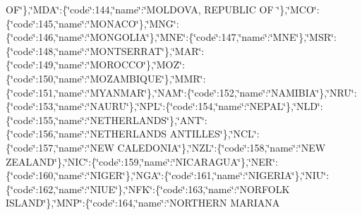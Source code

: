 \begin{DoxyCompactItemize}
O\-F\char`\"{}\},\char`\"{}M\-D\-A\char`\"{}\-:\{\char`\"{}code\char`\"{}\-:144,\char`\"{}name\char`\"{}\-:\char`\"{}M\-O\-L\-D\-O\-V\-A, R\-E\-P\-U\-B\-L\-I\-C O\-F \char`\"{}\},\char`\"{}M\-C\-O\char`\"{}\-:\{\char`\"{}code\char`\"{}\-:145,\char`\"{}name\char`\"{}\-:\char`\"{}M\-O\-N\-A\-C\-O\char`\"{}\},\char`\"{}M\-N\-G\char`\"{}\-:\{\char`\"{}code\char`\"{}\-:146,\char`\"{}name\char`\"{}\-:\char`\"{}M\-O\-N\-G\-O\-L\-I\-A\char`\"{}\},\char`\"{}M\-N\-E\char`\"{}\-:\{\char`\"{}code\char`\"{}\-:147,\char`\"{}name\char`\"{}\-:\char`\"{}M\-N\-E\char`\"{}\},\char`\"{}M\-S\-R\char`\"{}\-:\{\char`\"{}code\char`\"{}\-:148,\char`\"{}name\char`\"{}\-:\char`\"{}M\-O\-N\-T\-S\-E\-R\-R\-A\-T\char`\"{}\},\char`\"{}M\-A\-R\char`\"{}\-:\{\char`\"{}code\char`\"{}\-:149,\char`\"{}name\char`\"{}\-:\char`\"{}M\-O\-R\-O\-C\-C\-O\char`\"{}\},\char`\"{}M\-O\-Z\char`\"{}\-:\{\char`\"{}code\char`\"{}\-:150,\char`\"{}name\char`\"{}\-:\char`\"{}M\-O\-Z\-A\-M\-B\-I\-Q\-U\-E\char`\"{}\},\char`\"{}M\-M\-R\char`\"{}\-:\{\char`\"{}code\char`\"{}\-:151,\char`\"{}name\char`\"{}\-:\char`\"{}M\-Y\-A\-N\-M\-A\-R\char`\"{}\},\char`\"{}N\-A\-M\char`\"{}\-:\{\char`\"{}code\char`\"{}\-:152,\char`\"{}name\char`\"{}\-:\char`\"{}N\-A\-M\-I\-B\-I\-A\char`\"{}\},\char`\"{}N\-R\-U\char`\"{}\-:\{\char`\"{}code\char`\"{}\-:153,\char`\"{}name\char`\"{}\-:\char`\"{}N\-A\-U\-R\-U\char`\"{}\},\char`\"{}N\-P\-L\char`\"{}\-:\{\char`\"{}code\char`\"{}\-:154,\char`\"{}name\char`\"{}\-:\char`\"{}N\-E\-P\-A\-L\char`\"{}\},\char`\"{}N\-L\-D\char`\"{}\-:\{\char`\"{}code\char`\"{}\-:155,\char`\"{}name\char`\"{}\-:\char`\"{}N\-E\-T\-H\-E\-R\-L\-A\-N\-D\-S\char`\"{}\},\char`\"{}A\-N\-T\char`\"{}\-:\{\char`\"{}code\char`\"{}\-:156,\char`\"{}name\char`\"{}\-:\char`\"{}N\-E\-T\-H\-E\-R\-L\-A\-N\-D\-S A\-N\-T\-I\-L\-L\-E\-S\char`\"{}\},\char`\"{}N\-C\-L\char`\"{}\-:\{\char`\"{}code\char`\"{}\-:157,\char`\"{}name\char`\"{}\-:\char`\"{}N\-E\-W C\-A\-L\-E\-D\-O\-N\-I\-A\char`\"{}\},\char`\"{}N\-Z\-L\char`\"{}\-:\{\char`\"{}code\char`\"{}\-:158,\char`\"{}name\char`\"{}\-:\char`\"{}N\-E\-W Z\-E\-A\-L\-A\-N\-D\char`\"{}\},\char`\"{}N\-I\-C\char`\"{}\-:\{\char`\"{}code\char`\"{}\-:159,\char`\"{}name\char`\"{}\-:\char`\"{}N\-I\-C\-A\-R\-A\-G\-U\-A\char`\"{}\},\char`\"{}N\-E\-R\char`\"{}\-:\{\char`\"{}code\char`\"{}\-:160,\char`\"{}name\char`\"{}\-:\char`\"{}N\-I\-G\-E\-R\char`\"{}\},\char`\"{}N\-G\-A\char`\"{}\-:\{\char`\"{}code\char`\"{}\-:161,\char`\"{}name\char`\"{}\-:\char`\"{}N\-I\-G\-E\-R\-I\-A\char`\"{}\},\char`\"{}N\-I\-U\char`\"{}\-:\{\char`\"{}code\char`\"{}\-:162,\char`\"{}name\char`\"{}\-:\char`\"{}N\-I\-U\-E\char`\"{}\},\char`\"{}N\-F\-K\char`\"{}\-:\{\char`\"{}code\char`\"{}\-:163,\char`\"{}name\char`\"{}\-:\char`\"{}N\-O\-R\-F\-O\-L\-K I\-S\-L\-A\-N\-D\char`\"{}\},\char`\"{}M\-N\-P\char`\"{}\-:\{\char`\"{}code\char`\"{}\-:164,\char`\"{}name\char`\"{}\-:\char`\"{}N\-O\-R\-T\-H\-E\-R\-N M\-A\-R\-I\-A\-N\-A 
\end{DoxyCompactItemize}

